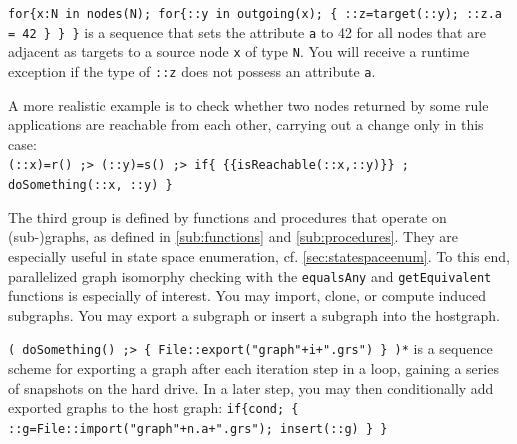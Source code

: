 \begin{example}
\verb#for{x:N in nodes(N); for{::y in outgoing(x); { ::z=target(::y); ::z.a = 42 } } }# 
is a sequence that sets the attribute \texttt{a} to 42 for all nodes that are adjacent as targets to a source node \texttt{x} of type \texttt{N}.
You will receive a runtime exception if the type of \verb#::z# does not possess an attribute \texttt{a}.

A more realistic example is to check whether two nodes returned by some rule applications are reachable from each other, carrying out a change only in this case:\\
\verb#(::x)=r() ;> (::y)=s() ;> if{ {{isReachable(::x,::y)}} ; doSomething(::x, ::y) }#
\end{example}

The third group is defined by functions and procedures that operate on (sub-)graphs, as defined in \ref{sub:functions} and \ref{sub:procedures}.
They are especially useful in state space enumeration, cf. \ref{sec:statespaceenum}.
To this end, parallelized graph isomorphy checking with the \texttt{equalsAny} and \texttt{getEquivalent} functions is especially of interest.
You may import, clone, or compute induced subgraphs.
You may export a subgraph or insert a subgraph into the hostgraph.

\begin{example}
\verb#( doSomething() ;> { File::export("graph"+i+".grs") } )*# is a sequence scheme for exporting a graph after each iteration step in a loop, gaining a series of snapshots on the hard drive.
In a later step, you may then conditionally add exported graphs to the host graph: 
\verb#if{cond; { ::g=File::import("graph"+n.a+".grs"); insert(::g) } }#
\end{example}

